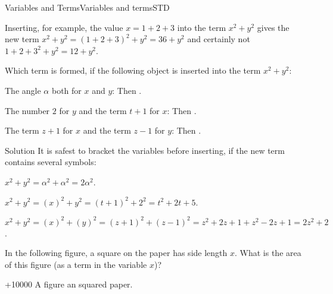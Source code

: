 \begin{MXContent}{Variables and Terms}{Variables and terms}{STD}
\begin{MExample}
Inserting, for example, the value $x=1+2+3$ into the term $x^2+y^2$ gives the new term 
$x^2+y^2=(1+2+3)^2+y^2=36+y^2$ and certainly not $1+2+3^2+y^2=12+y^2$.
\end{MExample}

\begin{MExercise}
Which term is formed, if the following object is inserted into the term $x^2+y^2$:
\begin{MExerciseItems}
\item{The angle $\alpha$ both for $x$ and $y$: Then .}
\item{The number $2$ for $y$ and the term $t+1$ for $x$: Then .}
\item{The term $z+1$ for $x$ and the term $z-1$ for $y$: Then .}
\end{MExerciseItems}

\begin{MHint}{Solution}
It is safest to bracket the variables before inserting, if the new term contains several symbols:
\begin{MExerciseItems}
\item{$x^2+y^2=\alpha^2+\alpha^2=2\alpha^2$.}
\item{$x^2+y^2=(x)^2+y^2=(t+1)^2+2^2=t^2+2t+5$.}
\item{$x^2+y^2=(x)^2+(y)^2=(z+1)^2+(z-1)^2=z^2+2z+1+z^2-2z+1=2z^2+2$.}
\end{MExerciseItems}
\end{MHint}
\end{MExercise}

\begin{MExercise}
In the following figure, a square on the paper has side length $x$. What is the area of this figure (as a term in the variable $x$)?

\begin{center}
\par\ifttm\else\penalty+10000\fi
A figure an squared paper.
\end{center}


\end{MExercise}
\end{MXContent}
